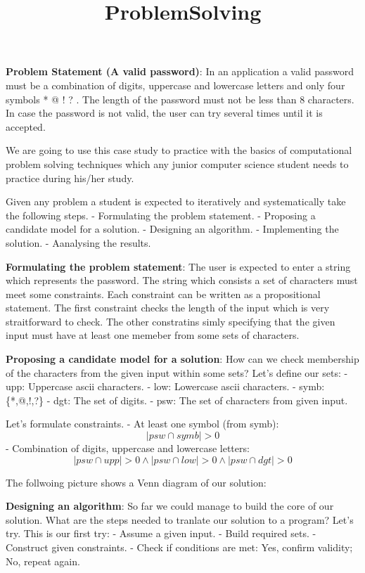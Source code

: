 \documentclass[11pt]{article}
\title{ProblemSolving}
\begin{document}
    
    
    \maketitle
    
    

    
    \textbf{Problem Statement (A valid password)}: In an application a valid
password must be a combination of digits, uppercase and lowercase
letters and only four symbols * @ ! ? . The length of the password must
not be less than 8 characters. In case the password is not valid, the
user can try several times until it is accepted.

    We are going to use this case study to practice with the basics of
computational problem solving techniques which any junior computer
science student needs to practice during his/her study.

Given any problem a student is expected to iteratively and
systematically take the following steps. - Formulating the problem
statement. - Proposing a candidate model for a solution. - Designing an
algorithm. - Implementing the solution. - Aanalysing the results.

\textbf{Formulating the problem statement}: The user is expected to
enter a string which represents the password. The string which consists
a set of characters must meet some constraints. Each constraint can be
written as a propositional statement. The first constraint checks the
length of the input which is very straitforward to check. The other
constratins simly specifying that the given input must have at least one
memeber from some sets of characters.

\textbf{Proposing a candidate model for a solution}: How can we check
membership of the characters from the given input within some sets?
Let's define our sets: - upp: Uppercase ascii characters. - low:
Lowercase ascii characters. - symb: \{*,@,!,?\} - dgt: The set of
digits. - psw: The set of characters from given input.

Let's formulate constraints. - At least one symbol (from symb):
\[| psw \cap symb | > 0\] - Combination of digits, uppercase and
lowercase letters:
\[| psw \cap upp | > 0 \wedge | psw \cap low | > 0 \wedge | psw \cap dgt | > 0\]

The follwoing picture shows a Venn diagram of our solution:

\textbf{Designing an algorithm}: So far we could manage to build the
core of our solution. What are the steps needed to tranlate our solution
to a program? Let's try. This is our first try: - Assume a given input.
- Build required sets. - Construct given constraints. - Check if
conditions are met: Yes, confirm validity; No, repeat again.
\end{document}
